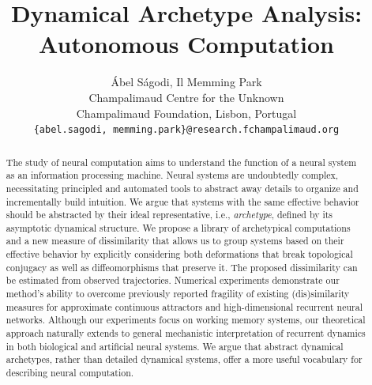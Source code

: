 \documentclass{article}
\title{Dynamical Archetype Analysis:\\Autonomous Computation}
\author{
\'Abel S\'agodi, Il Memming Park\\
    Champalimaud Centre for the Unknown\\
    Champalimaud Foundation, Lisbon, Portugal\\
    \texttt{\{abel.sagodi, memming.park\}@research.fchampalimaud.org} \\
}
\theoremstyle{definition} \newtheorem{definition}{Definition}  \newtheorem{example}{Example}
\theoremstyle{remark} \newtheorem{remark}{Remark}
\newcounter{ct}
\begin{document}
\maketitle


\begin{abstract}
The study of neural computation aims to understand the function of a neural system as an information processing machine.
Neural systems are undoubtedly complex, necessitating principled and automated tools to abstract away details to organize and incrementally build intuition.
We argue that systems with the same effective behavior should be abstracted by their ideal representative, i.e., \emph{archetype}, defined by its asymptotic dynamical structure. %
We propose a library of archetypical computations and a new measure of dissimilarity that allows us to group systems based on their effective behavior by explicitly considering both deformations that break topological conjugacy as well as diffeomorphisms that preserve it.
The proposed dissimilarity can be estimated from observed trajectories.
Numerical experiments demonstrate our method's ability to overcome previously reported fragility of existing (dis)similarity measures for approximate continuous attractors and high-dimensional recurrent neural networks.
Although our experiments focus on working memory systems, our theoretical approach naturally extends to general mechanistic interpretation of recurrent dynamics in both biological and artificial neural systems.
We argue that abstract dynamical archetypes, rather than detailed dynamical systems, offer a more useful vocabulary for describing neural computation.
%

\end{abstract}
\end{document}
